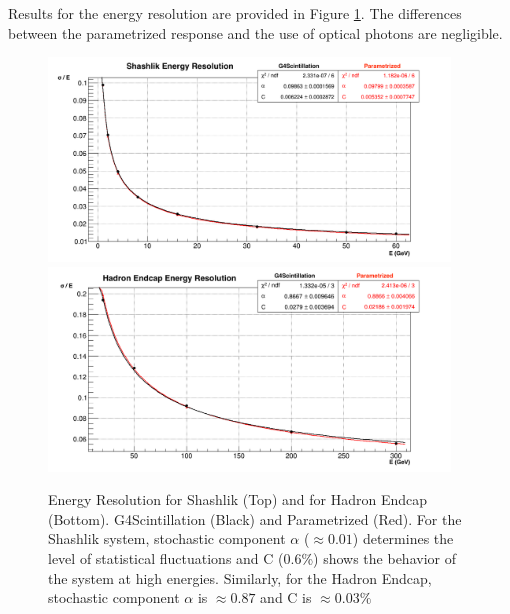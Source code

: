  Results for the energy resolution are provided in Figure \ref{fig:simulations_shashlikhe_resolution}. The differences between the parametrized response and the use of optical photons are negligible.
 \begin{figure}[htbp]
    \centering
    \includegraphics[width=0.95\textwidth]{figures/ch_simulations/shashlik/performance/energyResolution.png}\\
    \includegraphics[width=0.95\textwidth]{figures/ch_simulations/he/performance/Resolution.png}
    \caption{Energy Resolution for Shashlik (Top) and for Hadron Endcap (Bottom). G4Scintillation (Black) and Parametrized (Red). For the Shashlik system, stochastic component $\alpha$ ($\approx 0.01$) determines the level of statistical fluctuations and C (0.6\%) shows the behavior of the system at high energies. Similarly, for the Hadron Endcap, stochastic component $\alpha$ is $\approx 0.87$ and C is $\approx0.03\%$}
    \label{fig:simulations_shashlikhe_resolution}
 \end{figure}